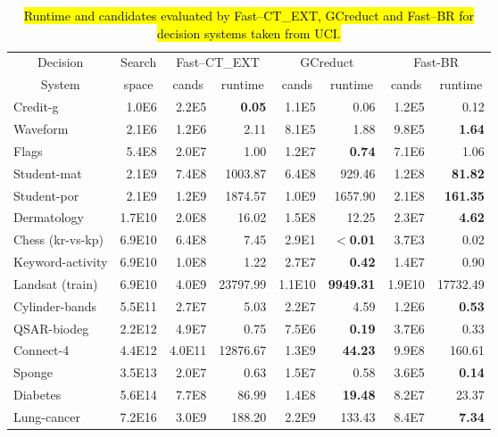 \documentclass[number,preprint,review,12pt]{elsarticle}
\begin{document}
    \begin{table}[htb]
    \centering \footnotesize
    \caption{\hl{Runtime and candidates evaluated by Fast--CT\_EXT, GCreduct and Fast--BR for decision systems taken from UCI.}}
    \label{tab:java}
    \begin{tabular}{|l|r|r|r|r|r|r|r|}
	    \hline
	    \multicolumn{1}{|c|}{Decision} & \multicolumn{1}{c|}{Search} & \multicolumn{2}{c|}{Fast--CT\_EXT} & \multicolumn{2}{c|}{GCreduct} & \multicolumn{2}{c|}{Fast-BR} \\
	    \cline{3-8}
	    \multicolumn{1}{|c|}{System}& \multicolumn{1}{c|}{space} & \multicolumn{1}{c|}{cands} & \multicolumn{1}{c|}{runtime} & \multicolumn{1}{c|}{cands} & \multicolumn{1}{c|}{runtime} & \multicolumn{1}{c|}{cands} & \multicolumn{1}{c|}{runtime}\\
	    \hline
	    Credit-g         & 1.0E6  & 2.2E5  & \textbf{0.05} & 1.1E5  & 0.06             & 1.2E5  & 0.12            \\
	    Waveform         & 2.1E6  & 1.2E6  & 2.11          & 8.1E5  & 1.88             & 9.8E5  & \textbf{1.64}   \\ 
	    Flags            & 5.4E8  & 2.0E7  & 1.00          & 1.2E7  & \textbf{0.74}    & 7.1E6  & 1.06            \\
	    Student-mat      & 2.1E9  & 7.4E8  & 1003.87       & 6.4E8  & 929.46           & 1.2E8  & \textbf{81.82}  \\
	    Student-por      & 2.1E9  & 1.2E9  & 1874.57       & 1.0E9  & 1657.90          & 2.1E8  & \textbf{161.35} \\  
	    Dermatology      & 1.7E10 & 2.0E8  & 16.02         & 1.5E8  & 12.25            & 2.3E7  & \textbf{4.62}   \\ 
	    Chess (kr-vs-kp) & 6.9E10 & 6.4E8  & 7.45          & 2.9E1  & \textbf{$<$0.01} & 3.7E3  & 0.02            \\
	    Keyword-activity & 6.9E10 & 1.0E8  & 1.22          & 2.7E7  & \textbf{0.42}    & 1.4E7  & 0.90            \\
	    Landsat (train)  & 6.9E10 & 4.0E9  & 23797.99      & 1.1E10 & \textbf{9949.31} & 1.9E10 & 17732.49        \\
	    Cylinder-bands   & 5.5E11 & 2.7E7  & 5.03          & 2.2E7  & 4.59             & 1.2E6  & \textbf{0.53}   \\
	    QSAR-biodeg      & 2.2E12 & 4.9E7  & 0.75          & 7.5E6  & \textbf{0.19}    & 3.7E6  & 0.33            \\
	    Connect-4        & 4.4E12 & 4.0E11 & 12876.67      & 1.3E9  & \textbf{44.23}   & 9.9E8  & 160.61          \\
	    Sponge           & 3.5E13 & 2.0E7  & 0.63          & 1.5E7  & 0.58             & 3.6E5  & \textbf{0.14}   \\ 
	    Diabetes         & 5.6E14 & 7.7E8  & 86.99         & 1.4E8  & \textbf{19.48}   & 8.2E7  & 23.37           \\
	    Lung-cancer      & 7.2E16 & 3.0E9  & 188.20        & 2.2E9  & 133.43           & 8.4E7  & \textbf{7.34}   \\
        \hline       
    \end{tabular}
    \end{table}
\end{document}
